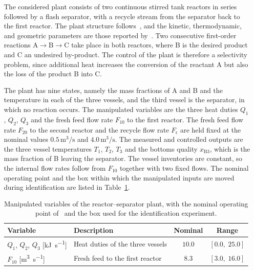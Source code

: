 \documentclass[preprint,12pt,authoryear]{elsarticle}
\theoremstyle{remark}
\newcommand{\ui}[2]{#1_{\text{#2}}}
\begin{document}
The considered plant consists of two continuous stirred tank reactors in series followed by a flash separator, with a recycle stream from the separator back to the first reactor. The plant structure follows~\cite{liu2009distributed}, and the kinetic, thermodynamic, and geometric parameters are those reported by~\cite{li2019dynamic}. Two consecutive first-order reactions $\text{A} \rightarrow \text{B} \rightarrow \text{C}$ take place in both reactors, where B is the desired product and C an undesired by-product. The control of the plant is therefore a selectivity problem, since additional heat increases the conversion of the reactant A but also the loss of the product B into C.

The plant has nine states, namely the mass fractions of A and B and the temperature in each of the three vessels, and the third vessel is the separator, in which no reaction occurs. The manipulated variables are the three heat duties $Q_1$, $Q_2$, $Q_3$ and the fresh feed flow rate $F_{10}$ to the first reactor. The fresh feed flow rate $F_{20}$ to the second reactor and the recycle flow rate $\ui{F}{r}$ are held fixed at the nominal values $0.5\,\text{m}^3/\text{s}$ and $4.0\,\text{m}^3/\text{s}$. The measured and controlled outputs are the three vessel temperatures $T_1$, $T_2$, $T_3$ and the bottoms quality $x_{\text{B}3}$, which is the mass fraction of B leaving the separator. The vessel inventories are constant, so the internal flow rates follow from $F_{10}$ together with two fixed flows. The nominal operating point and the box within which the manipulated inputs are moved during identification are listed in Table~\ref{tab:cstr-sep-inputs}.

\begin{table}[h]
  \centering
  \small
  \caption{Manipulated variables of the reactor--separator plant, with the nominal operating point of~\cite{li2019dynamic} and the box used for the identification experiment.}
  \label{tab:cstr-sep-inputs}
  \begin{tabular}{llcc}
    \toprule
    Variable & Description & Nominal & Range \\
    \midrule
    $Q_1$, $Q_2$, $Q_3$ [\si{\kilo\joule\per\second}] & Heat duties of the three vessels & $10.0$ & $[0.0,\; 25.0]$ \\
    $F_{10}$ [\si{\cubic\meter\per\second}] & Fresh feed to the first reactor & $8.3$ & $[3.0,\; 16.0]$ \\
    \bottomrule
  \end{tabular}
\end{table}
\end{document}
